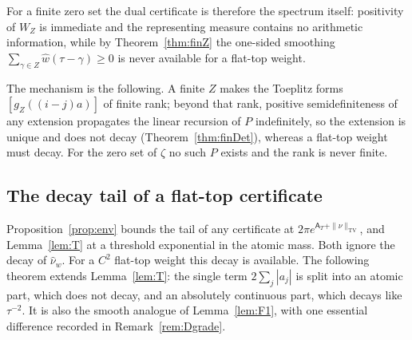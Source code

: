 \documentclass[11pt]{amsart}
\theoremstyle{definition}
\theoremstyle{remark}
\newcommand{\TV}{\operatorname{TV}}
\newcommand{\nuh}{\widehat\nu}
\newcommand{\wh}{\widehat w}
\newcommand{\Aconst}{\mathsf A_T}
\begin{document}
For a finite zero set the dual certificate is therefore the spectrum itself: positivity of $W_Z$ is
immediate and the representing measure contains no arithmetic information, while by
Theorem~\ref{thm:finZ} the one-sided smoothing $\sum_{\gamma\in Z}\wh(\tau-\gamma)\ge0$ is never
available for a flat-top weight.

The mechanism is the following. A finite $Z$ makes the Toeplitz forms $[g_Z((i-j)a)]$ of finite rank;
beyond that rank, positive semidefiniteness of any extension propagates the linear recursion of $P$
indefinitely, so the extension is unique and does not decay (Theorem~\ref{thm:finDet}), whereas a
flat-top weight must decay. For the zero set of $\zeta$ no such $P$ exists and the rank is never finite.

\subsection{The decay tail of a flat-top certificate}

Proposition~\ref{prop:env} bounds the tail of any certificate at $2\pi e^{\Aconst+\|\nu\|_{\TV}}$,
and Lemma~\ref{lem:T} at a threshold exponential in the atomic mass. Both ignore the decay of
$\nuh_w$. For a $C^2$ flat-top weight this decay is available. The following theorem extends
Lemma~\ref{lem:T}: the single term $2\sum_j|a_j|$ is split into an atomic part, which does not decay,
and an absolutely continuous part, which decays like $\tau^{-2}$. It is also the smooth analogue of
Lemma~\ref{lem:F1}, with one essential difference recorded in Remark~\ref{rem:Dgrade}.
\end{document}
